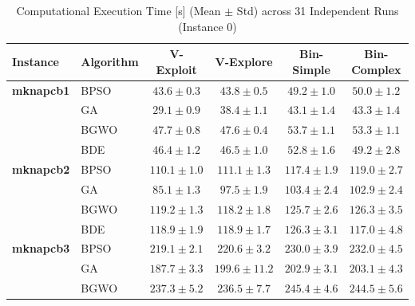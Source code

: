 \begin{table}[htbp]
  \centering
  \small
  \caption{Computational Execution Time [s] (Mean $\pm$ Std) across 31 Independent Runs (Instance 0)}
  \label{tab:computational_cost_inst0}
  \begin{tabular*}{\textwidth}{@{\extracolsep{\fill}}llcccc@{}}
    \toprule
    \textbf{Instance} & \textbf{Algorithm} & \textbf{V-Exploit} & \textbf{V-Explore} & \textbf{Bin-Simple} & \textbf{Bin-Complex} \\
    \midrule
    \textbf{mknapcb1}  & BPSO  &  $\mathbf{43.6 \pm 0.3}$ &           $43.8 \pm 0.5$ &           $49.2 \pm 1.0$ &           $50.0 \pm 1.2$ \\
                       & GA    &  $\mathbf{29.1 \pm 0.9}$ &           $38.4 \pm 1.1$ &           $43.1 \pm 1.4$ &           $43.3 \pm 1.4$ \\
                       & BGWO  &           $47.7 \pm 0.8$ &  $\mathbf{47.6 \pm 0.4}$ &           $53.7 \pm 1.1$ &           $53.3 \pm 1.1$ \\
                       & BDE   &  $\mathbf{46.4 \pm 1.2}$ &           $46.5 \pm 1.0$ &           $52.8 \pm 1.6$ &           $49.2 \pm 2.8$ \\
    \midrule
    \textbf{mknapcb2}  & BPSO  & $\mathbf{110.1 \pm 1.0}$ &          $111.1 \pm 1.3$ &          $117.4 \pm 1.9$ &          $119.0 \pm 2.7$ \\
                       & GA    &  $\mathbf{85.1 \pm 1.3}$ &           $97.5 \pm 1.9$ &          $103.4 \pm 2.4$ &          $102.9 \pm 2.4$ \\
                       & BGWO  &          $119.2 \pm 1.3$ & $\mathbf{118.2 \pm 1.8}$ &          $125.7 \pm 2.6$ &          $126.3 \pm 3.5$ \\
                       & BDE   &          $118.9 \pm 1.9$ &          $118.9 \pm 1.7$ &          $126.3 \pm 3.1$ & $\mathbf{117.0 \pm 4.8}$ \\
    \midrule
    \textbf{mknapcb3}  & BPSO  & $\mathbf{219.1 \pm 2.1}$ &          $220.6 \pm 3.2$ &          $230.0 \pm 3.9$ &          $232.0 \pm 4.5$ \\
                       & GA    & $\mathbf{187.7 \pm 3.3}$ &         $199.6 \pm 11.2$ &          $202.9 \pm 3.1$ &          $203.1 \pm 4.3$ \\
                       & BGWO  &          $237.3 \pm 5.2$ & $\mathbf{236.5 \pm 7.7}$ &          $245.4 \pm 4.6$ &          $244.5 \pm 5.6$ \\

\end{tabular*}
\end{table}
